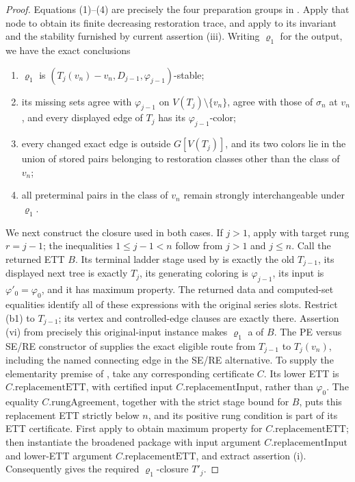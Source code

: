 \begin{proof}
Equations (1)--(4) are precisely the four preparation groups in
.  Apply that node to obtain its finite
decreasing restoration trace, and apply 
to its invariant and the stability furnished by current assertion (iii).
Writing \(\varrho_1\) for the output, we have the exact conclusions
\begin{enumerate}
\item[(b1)] \(\varrho_1\) is
  \((T_j(v_n)-v_n,D_{j-1},\varphi_{j-1})\)-stable;
\item[(b2)] its missing sets agree with \(\varphi_{j-1}\) on
  \(V(T_j)\setminus\{v_n\}\), agree with those of \(\sigma_n\) at
  \(v_n\), and every displayed edge of \(T_j\) has its
  \(\varphi_{j-1}\)-color;
\item[(b3)] every changed exact edge is outside \(G[V(T_j)]\), and its
  two colors lie in the union of stored pairs belonging to restoration
  classes other than the class of \(v_n\);
\item[(b4)] all preterminal pairs in the class of \(v_n\) remain
  strongly interchangeable under \(\varrho_1\).
\end{enumerate}

We next construct the closure used in both cases.  If \(j>1\), apply
 with target rung \(r=j-1\); the
inequalities \(1\leq j-1<n\) follow from \(j>1\) and \(j\leq n\).
Call the returned ETT \(B\).  Its terminal ladder stage used by
 is exactly the old \(T_{j-1}\), its displayed next
tree is exactly \(T_j\), its generating coloring is
\(\varphi_{j-1}\), its input is \(\varphi'_0=\varphi_0\), and it has
maximum property.  The returned data and computed-set equalities identify
all of these expressions with the original series slots.
Restrict (b1) to \(T_{j-1}\); its vertex and controlled-edge clauses are
exactly  there.  Assertion (vi) from precisely this
original-input instance makes \(\varrho_1\) a  of
\(B\).  The PE versus SE/RE
constructor of  supplies the exact eligible
route from \(T_{j-1}\) to \(T_j(v_n)\), including the named connecting
edge in the SE/RE alternative.  To supply the elementarity premise of
, take any corresponding certificate \(C\).
Its lower ETT is \(C.\mathrm{replacementETT}\), with certified input
\(C.\mathrm{replacementInput}\), rather than \(\varphi_0\).  The equality
\(C.\mathrm{rungAgreement}\), together with the strict stage bound for
\(B\), puts this replacement ETT strictly below \(n\), and its positive
rung condition is part of its ETT certificate.  First apply
 to obtain maximum property for
\(C.\mathrm{replacementETT}\); then instantiate the broadened package with
input argument \(C.\mathrm{replacementInput}\) and lower-ETT argument
\(C.\mathrm{replacementETT}\), and extract assertion (i).  Consequently
 gives the required \(\varrho_1\)-closure
\(T'_j\).


\end{proof}
